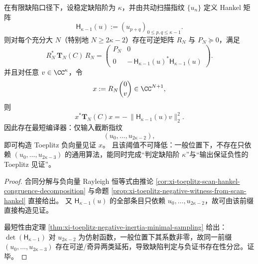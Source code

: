 \begin{conclusion}\label{con:xi-scan-toeplitz-negative-certificate-shortest-compiler}
在有限缺陷口径下，设稳定缺陷阶为 \(\kappa\)，并由共动扫描指纹 \(\{u_n\}\) 定义 Hankel 矩阵
\[
\mathsf H_{\kappa-1}(u):=(u_{p+q})_{0\le p,q\le \kappa-1}.
\]
则对每个充分大 \(N\)（特别地 \(N\ge 2\kappa-2\)）存在可逆矩阵 \(R_N\) 与 \(P_N\succeq 0\)，满足
\[
R_N^\ast\,\mathbf T_N(C)\,R_N
=
\begin{pmatrix}
P_N & 0\\
0 & -\,\mathsf H_{\kappa-1}(u)^\ast\mathsf H_{\kappa-1}(u)
\end{pmatrix}.
\]
并且对任意 \(v\in\CC^\kappa\)，令
\[
x:=R_N\binom{0}{v}\in\CC^{N+1},
\]
则
\[
x^\ast\mathbf T_N(C)x
=-\,\|\mathsf H_{\kappa-1}(u)v\|_2^2.
\]
因此存在最短编译器：仅输入截断指纹
\[
(u_0,\dots,u_{2\kappa-2}),
\]
即可构造 Toeplitz 负向量见证 \(x\)。
且该阈值不可降低：一般位置下，不存在只依赖 \((u_0,\dots,u_{2\kappa-3})\) 的通用算法，能同时完成“判定缺陷阶 \(\kappa\)”与“输出保证负性的 Toeplitz 见证”。
\end{conclusion}
\begin{proof}
合同分解与负向量 Rayleigh 恒等式由推论 \ref{cor:xi-toeplitz-scan-hankel-congruence-decomposition} 与命题 \ref{prop:xi-toeplitz-negative-witness-from-scan-hankel} 直接给出。
又 \(\mathsf H_{\kappa-1}(u)\) 的全部条目只依赖 \(u_0,\dots,u_{2\kappa-2}\)，故可由该前缀直接构造见证。
\par
最短性由定理 \ref{thm:xi-toeplitz-negative-inertia-minimal-sampling} 给出：\(\det(\mathsf H_{\kappa-1})\) 对 \(u_{2\kappa-2}\) 为仿射函数，一般位置下其系数非零，故同一前缀 \((u_0,\dots,u_{2\kappa-3})\) 存在可逆/奇异两类延拓，导致缺陷判定与负证书存在性分岔。证毕。
\end{proof}


